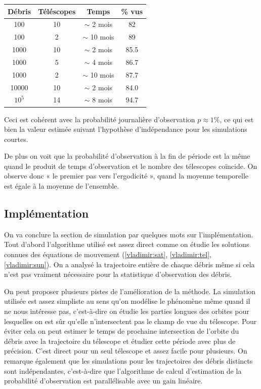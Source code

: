 \begin{center}
\begin{tabular}{|c|c|c|c|} \hline
 D\'ebris & T\'el\'escopes & Temps & \% vus \\ 
 \hline \hline
 100 & 10 & $\sim$ 2 mois &82 \\
 \hline
 100 & 2 & $\sim$ 10 mois &89 \\
 \hline
 \hline
 1000 & 10 & $\sim$ 2 mois &85.5 \\
 \hline
 1000 & 5 & $\sim$ 4 mois &86.7 \\
 \hline
 1000 & 2 & $\sim$ 10 mois &87.7 \\
 \hline  
 \hline
 10000 & 10 & $\sim$ 2 mois &84.0 \\
 \hline
 \hline
 $10^5$ & 14 & $\sim$ 8 mois &  94.7 \\
 \hline
\end{tabular} 
\end{center}
Ceci est coh\'erent avec la probabilit\'e journali\`ere d'observation 
   $p \approx 1\%$, ce qui est bien la valeur estim\'ee suivant l'hypoth\`ese 
   d'ind\'ependance pour les simulations courtes. 
   
   De plus on voit que la probabilit\'e d'observation \`a la fin de p\'eriode
   est la m\^eme quand le produit de temps d'observation et le nombre des t\'elescopes
   coïncide. On observe donc « le premier pas vers l'ergodicit\'e », quand la moyenne 
   temporelle est \'egale \`a la moyenne de l'ensemble. 
   
   \subsection{Impl\'ementation}
On va conclure la section de simulation par quelques mots sur l'impl\'ementation.
Tout d'abord l'algorithme utilis\'e est assez direct comme on \'etudie les solutions 
connues des \'equations de mouvement (\ref{vladimir:sat}, \ref{vladimir:tel}, \ref{vladimir:sun}). On a analys\'e la trajectoire enti\`ere de chaque d\'ebris m\^eme si cela n'est pas vraiment 
n\'ecessaire pour la statistique d'observation des d\'ebris.

On peut proposer plusieurs pistes de l'am\'elioration de la m\'ethode. 
La simulation utilis\'ee est assez simpliste au sens qu'on mod\'elise le ph\'enom\`ene m\^eme quand il
 ne nous int\'eresse pas, c'est-\`a-dire on \'etudie les parties longues des orbites pour lesquelles on est sûr 
qu'elle n'intersectent pas le champ de vue du t\'elescope. Pour \'eviter cela on peut estimer le temps de prochaine
intersection de l'orbite du d\'ebris avec la trajectoire du t\'elescope et \'etudier cette p\'eriode avec plus de pr\'ecision. 
C'est direct pour un seul t\'elescope et assez facile pour plusieurs. On remarque \'egalement que les simulations
pour les trajectoires des d\'ebris distincts sont ind\'ependantes,
c'est-\`a-dire que l'algorithme de calcul d'estimation de la
probabilit\'e d'observation est parall\'elisable avec un gain lin\'eaire. 
   
   
